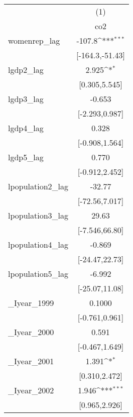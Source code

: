 {
\def\sym#1{\ifmmode^{#1}\else\(^{#1}\)\fi}
\begin{tabular}{l*{1}{c}}
\hline\hline
            &\multicolumn{1}{c}{(1)}        \\
            &\multicolumn{1}{c}{co2}        \\
\hline
womenrep\_lag&                -107.8\sym{***}\\
            &       [-164.3,-51.43]         \\
[1em]
lgdp2\_lag   &                 2.925\sym{*}  \\
            &         [0.305,5.545]         \\
[1em]
lgdp3\_lag   &                -0.653         \\
            &        [-2.293,0.987]         \\
[1em]
lgdp4\_lag   &                 0.328         \\
            &        [-0.908,1.564]         \\
[1em]
lgdp5\_lag   &                 0.770         \\
            &        [-0.912,2.452]         \\
[1em]
lpopulation2\_lag&                -32.77         \\
            &        [-72.56,7.017]         \\
[1em]
lpopulation3\_lag&                 29.63         \\
            &        [-7.546,66.80]         \\
[1em]
lpopulation4\_lag&                -0.869         \\
            &        [-24.47,22.73]         \\
[1em]
lpopulation5\_lag&                -6.992         \\
            &        [-25.07,11.08]         \\
[1em]
\_Iyear\_1999 &                0.1000         \\
            &        [-0.761,0.961]         \\
[1em]
\_Iyear\_2000 &                 0.591         \\
            &        [-0.467,1.649]         \\
[1em]
\_Iyear\_2001 &                 1.391\sym{*}  \\
            &         [0.310,2.472]         \\
[1em]
\_Iyear\_2002 &                 1.946\sym{***}\\
            &         [0.965,2.926]         \\

\end{tabular}}
